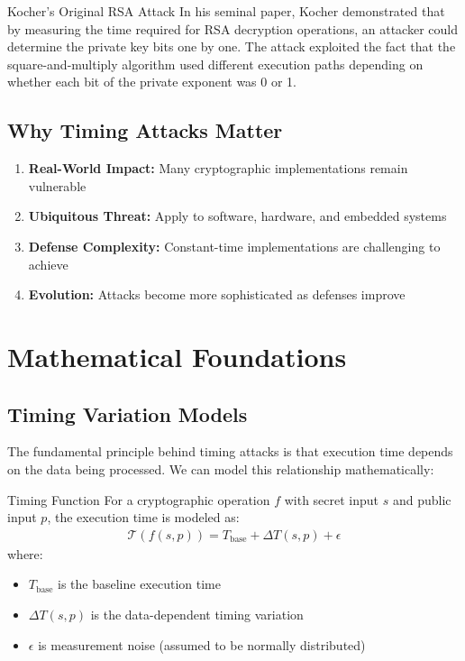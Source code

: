 \documentclass[12pt,a4paper]{article}
\theoremstyle{definition}
\newcommand{\time}[1]{\mathcal{T}\left(#1\right)}
\begin{document}
\begin{examplebox}{Kocher's Original RSA Attack}
In his seminal paper, Kocher demonstrated that by measuring the time required for RSA decryption operations, an attacker could determine the private key bits one by one. The attack exploited the fact that the square-and-multiply algorithm used different execution paths depending on whether each bit of the private exponent was 0 or 1.
\end{examplebox}

\subsection{Why Timing Attacks Matter}

\begin{enumerate}
    \item \textbf{Real-World Impact:} Many cryptographic implementations remain vulnerable
    \item \textbf{Ubiquitous Threat:} Apply to software, hardware, and embedded systems
    \item \textbf{Defense Complexity:} Constant-time implementations are challenging to achieve
    \item \textbf{Evolution:} Attacks become more sophisticated as defenses improve
\end{enumerate}

\section{Mathematical Foundations}

\subsection{Timing Variation Models}

The fundamental principle behind timing attacks is that execution time depends on the data being processed. We can model this relationship mathematically:

\begin{definitionbox}{Timing Function}
For a cryptographic operation $f$ with secret input $s$ and public input $p$, the execution time is modeled as:
\begin{align}
\time{f(s,p)} = T_{\text{base}} + \Delta T(s,p) + \epsilon
\end{align}
where:
\begin{itemize}
    \item $T_{\text{base}}$ is the baseline execution time
    \item $\Delta T(s,p)$ is the data-dependent timing variation
    \item $\epsilon$ is measurement noise (assumed to be normally distributed)
\end{itemize}
\end{definitionbox}
\end{document}
